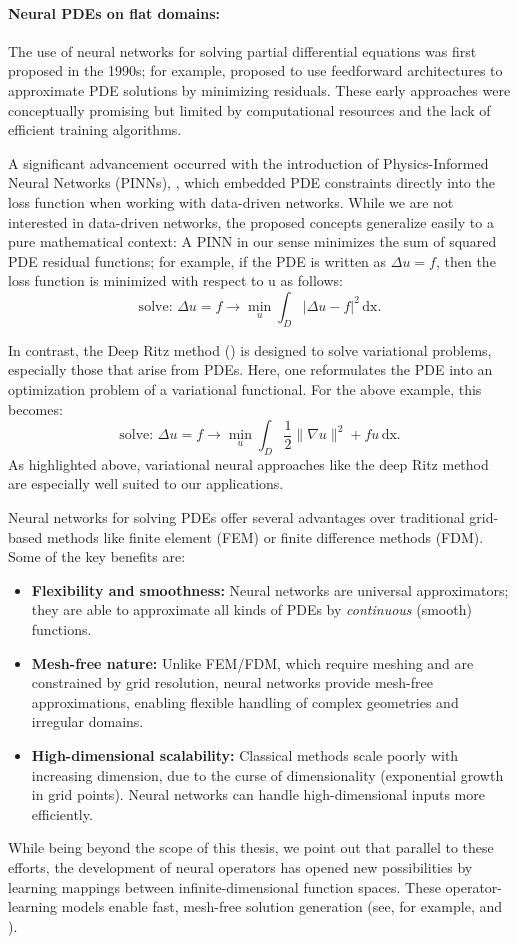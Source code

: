\documentclass[12pt,openany]{book}
\theoremstyle{plainnormal}
\theoremstyle{remark}
\begin{document}
\paragraph{Neural PDEs on flat domains:}
The use of neural networks for solving partial differential equations was first proposed in the 1990s; for example, \cite{Lagaris_1998} proposed to use feedforward architectures to approximate PDE solutions by minimizing residuals. These early approaches were conceptually promising but limited by computational resources and the lack of efficient training algorithms. \par
A significant advancement occurred with the introduction of Physics-Informed Neural Networks (PINNs), \cite{RAISSI2019686}, which embedded PDE constraints directly into the loss function when working with data-driven networks. While we are not interested in data-driven networks, the proposed concepts generalize easily to a pure mathematical context: A PINN in our sense minimizes the sum of squared PDE residual functions; for example, if the PDE is written as $\Delta u = f$, then the loss function is minimized with respect to u as follows:  $$ \text{solve: }\Delta u = f \rightarrow \min_u \int_D|\Delta u - f| ^2 \,\mathrm{dx}.$$
\par
In contrast, the Deep Ritz method (\cite{deepritzmethoddeep}) is designed to solve variational problems, especially those that arise from PDEs. Here, one reformulates the PDE into an optimization problem of a variational functional. For the above example, this becomes: $$\text{solve: } \Delta u = f \rightarrow \min_u \int_D \frac{1}{2}\|\nabla u\|^2 + fu \,\mathrm{dx}.$$
As highlighted above, variational neural approaches like the deep Ritz method are especially well suited to our applications.
\par
Neural networks for solving PDEs offer several advantages over traditional grid-based methods like finite element (FEM) or finite difference methods (FDM). Some of the key benefits are: \begin{itemize}
\item \textbf{Flexibility and smoothness:}
Neural networks are universal approximators; they are able to approximate all kinds of PDEs by \emph{continuous} (smooth) functions. 
\item\textbf{Mesh-free nature:} Unlike FEM/FDM, which require meshing and are constrained by grid resolution, neural networks provide mesh-free approximations, enabling flexible handling of complex geometries and irregular domains.
\item \textbf{High-dimensional scalability:} Classical methods scale poorly with increasing dimension, due to the curse of dimensionality (exponential growth in grid points). Neural networks can handle high-dimensional inputs more efficiently.
\end{itemize}
While being beyond the scope of this thesis, we point out that parallel to these efforts, the development of neural operators has opened new possibilities by learning mappings between infinite-dimensional function spaces. These operator-learning models enable fast, mesh-free solution generation (see, for example, \cite{li2021fourierneuraloperatorparametric} and \cite{Lu_2021}).
\end{document}
